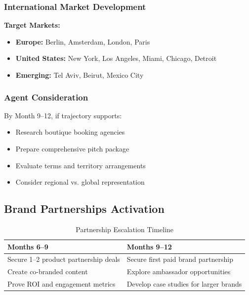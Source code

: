 \documentclass[11pt,a4paper]{article}
\begin{document}
\subsubsection{International Market Development}

\noindent\textbf{Target Markets:}
\begin{itemize}[leftmargin=*]
    \item \textbf{Europe:} Berlin, Amsterdam, London, Paris
    \item \textbf{United States:} New York, Los Angeles, Miami, Chicago, Detroit
    \item \textbf{Emerging:} Tel Aviv, Beirut, Mexico City
\end{itemize}

\subsubsection{Agent Consideration}
By Month 9--12, if trajectory supports:
\begin{itemize}[leftmargin=*]
    \item Research boutique booking agencies
    \item Prepare comprehensive pitch package
    \item Evaluate terms and territory arrangements
    \item Consider regional vs. global representation
\end{itemize}

\subsection{Brand Partnerships Activation}

\begin{table}[h!]
\centering
\renewcommand{\arraystretch}{1.3}
\begin{tabularx}{\textwidth}{X X}
\toprule
\rowcolor{amaraprimary}
\textcolor{amaracream}{\textbf{Months 6--9}} & \textcolor{amaracream}{\textbf{Months 9--12}} \\
\midrule
Secure 1--2 product partnership deals & Secure first paid brand partnership \\
Create co-branded content & Explore ambassador opportunities \\
Prove ROI and engagement metrics & Develop case studies for larger brands \\
\bottomrule
\end{tabularx}
\caption{Partnership Escalation Timeline}
\end{table}
\end{document}
